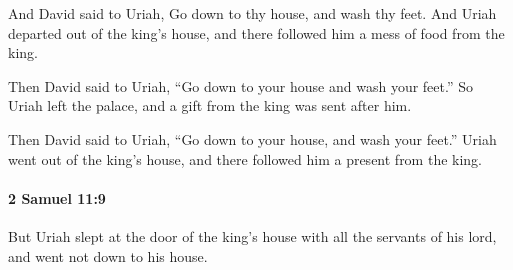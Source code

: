 			\begin{versebox}
					\item[BHS] 
					\item[ASV] And David said to Uriah, Go down to thy house, and wash thy feet. And Uriah departed out of the king's house, and there followed him a mess of food from the king.
					\item[NIV] Then David said to Uriah, “Go down to your house and wash your feet.” So Uriah left the palace, and a gift from the king was sent after him.
					\item[NRSV] Then David said to Uriah, “Go down to your house, and wash your feet.” Uriah went out of the king’s house, and there followed him a present from the king.
			\end{versebox}

		\paragraph{2 Samuel 11:9} %
			\label{2SAMUEL-11-9}

			But Uriah slept at the door of the king’s house with all the servants of his lord, and went not down to his house.

